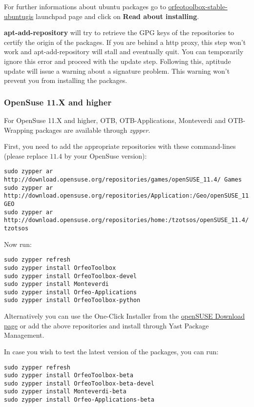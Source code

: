For further informations about ubuntu packages go to \href{https://launchpad.net/~otb/+archive/orfeotoolbox-stable-ubuntugis}{orfeotoolbox-stable-ubuntugis} launchpad page and click on \textbf{Read about installing}.

\textbf{apt-add-repository} will try to retrieve the GPG keys of the repositories to certify the origin of the packages. If you are behind a http proxy, this step won't work and apt-add-repository will stall and eventually quit. You can temporarily ignore this error and proceed with the update step. Following this, aptitude update will issue a warning about a signature problem. This warning won't prevent you from installing the packages.

\subsubsection{OpenSuse 11.X and higher}
\label{ssec:opensuse_binaries}

For OpenSuse 11.X and higher, OTB, OTB-Applications, Monteverdi and 
OTB-Wrapping packages are available through \emph{zypper}.

First, you need to add the appropriate repositories with these command-lines (please replace $11.4$ by your OpenSuse version):
\begin{verbatim}
sudo zypper ar 
http://download.opensuse.org/repositories/games/openSUSE_11.4/ Games
sudo zypper ar 
http://download.opensuse.org/repositories/Application:/Geo/openSUSE_11.4/ GEO
sudo zypper ar 
http://download.opensuse.org/repositories/home:/tzotsos/openSUSE_11.4/ tzotsos
\end{verbatim}

Now run:
\begin{verbatim}
sudo zypper refresh
sudo zypper install OrfeoToolbox
sudo zypper install OrfeoToolbox-devel
sudo zypper install Monteverdi
sudo zypper install Orfeo-Applications
sudo zypper install OrfeoToolbox-python
\end{verbatim}

Alternatively you can use the One-Click Installer from the \href{http://software.opensuse.org/search?q=Orfeo&baseproject=openSUSE\%3A11.4&lang=en&include_home=true&exclude_debug=true}{openSUSE Download page} or add the above repositories and install through Yast Package Management.

In case you wish to test the latest version of the packages, you can run:
\begin{verbatim}
sudo zypper refresh
sudo zypper install OrfeoToolbox-beta
sudo zypper install OrfeoToolbox-beta-devel
sudo zypper install Monteverdi-beta
sudo zypper install Orfeo-Applications-beta
\end{verbatim}

